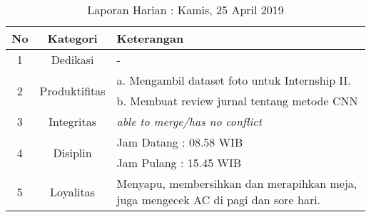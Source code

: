 \begin{table}[htp]
\begin{center}
\caption{Laporan Harian : Kamis, 25 April 2019}
\label{tab:lh250419}
\begin{tabularx}{\textwidth}{|l|l|X|}
\hline
\multicolumn{1}{|c|}{\textbf{No}} & \multicolumn{1}{c|}{\textbf{Kategori}} & \textbf{Keterangan} \\ \hline
\multicolumn{1}{|c|}{\multirow{1}{*}{1}} & \multicolumn{1}{c|}{\multirow{1}{*}{\parbox{2.5cm}{Dedikasi}}}
& -\\
\hline
\multicolumn{1}{|c|}{\multirow{2}{*}{2}} & \multicolumn{1}{c|}{\multirow{2}{*}{\parbox{2.5cm}{Produktifitas}}}
& a. Mengambil dataset foto untuk Internship II.\\
\multicolumn{1}{|c|}{\multirow{1}{*}{}} & \multicolumn{1}{c|}{\multirow{1}{*}{\parbox{2.5cm}{}}}
& b. Membuat review jurnal tentang metode CNN\\
\hline
\multicolumn{1}{|c|}{\multirow{1}{*}{3}} & \multicolumn{1}{c|}{\multirow{1}{*}{\parbox{2.5cm}{Integritas}}}
& \textit{able to merge/has no conflict} \\
\hline
\multicolumn{1}{|c|}{\multirow{2}{*}{4}} & \multicolumn{1}{c|}{\multirow{2}{*}{\parbox{2.5cm}{Disiplin}}}
& Jam Datang : 08.58 WIB \\
\multicolumn{1}{|c|}{\multirow{1}{*}{}} & \multicolumn{1}{c|}{\multirow{1}{*}{\parbox{2.5cm}{}}}
& Jam Pulang : 15.45 WIB \\
\hline
\multicolumn{1}{|c|}{\multirow{2}{*}{5}} & \multicolumn{1}{c|}{\multirow{2}{*}{\parbox{2.5cm}{Loyalitas}}}
& Menyapu, membersihkan dan merapihkan meja, juga mengecek AC di pagi dan sore hari.\\
\hline
\end{tabularx}
\end{center}
\end{table}

